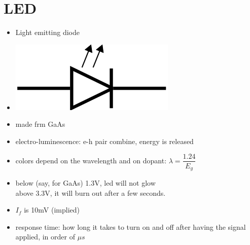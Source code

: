 \documentclass[10pt, a4paper]{report}
\begin{document}
	\section{LED}
	\begin{itemize}
		\item Light emitting diode
		\item \includegraphics[width=0.2\linewidth]{img/led symbol}
		\item made frm GaAs
		\item electro-luminescence: e-h pair combine, energy is released
		\item colors depend on the wavelength and on dopant: $ \lambda = \dfrac{1.24}{E_g} $
		\item below (say, for GaAs) 1.3V, led will not glow\\ above 3.3V, it will burn out after a few seconds.
		\item $ I_f $ is 10mV (implied)
		\item response time: how long it takes to turn on and off after having the signal applied, in order of $ \mu s $
		
	\end{itemize}
\end{document}
